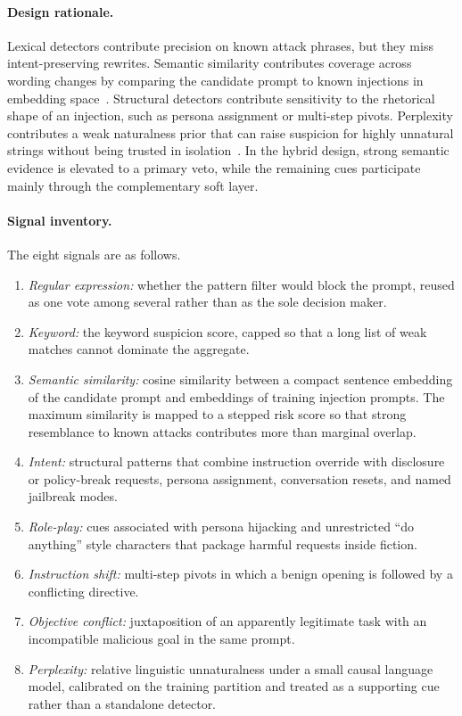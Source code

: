 ﻿\documentclass[10pt]{article}
\begin{document}
\paragraph{Design rationale.}
Lexical detectors contribute precision on known attack phrases, but they miss intent-preserving rewrites.
Semantic similarity contributes coverage across wording changes by comparing the candidate prompt to known injections in embedding space~\cite{reimers2019sentence,wang2020minilm}.
Structural detectors contribute sensitivity to the rhetorical shape of an injection, such as persona assignment or multi-step pivots.
Perplexity contributes a weak naturalness prior that can raise suspicion for highly unnatural strings without being trusted in isolation~\cite{radford2019language}.
In the hybrid design, strong semantic evidence is elevated to a primary veto, while the remaining cues participate mainly through the complementary soft layer.

\paragraph{Signal inventory.}
The eight signals are as follows.
\begin{enumerate}
  \item \emph{Regular expression:} whether the pattern filter would block the prompt, reused as one vote among several rather than as the sole decision maker.
  \item \emph{Keyword:} the keyword suspicion score, capped so that a long list of weak matches cannot dominate the aggregate.
  \item \emph{Semantic similarity:} cosine similarity between a compact sentence embedding of the candidate prompt and embeddings of training injection prompts.
    The maximum similarity is mapped to a stepped risk score so that strong resemblance to known attacks contributes more than marginal overlap.
  \item \emph{Intent:} structural patterns that combine instruction override with disclosure or policy-break requests, persona assignment, conversation resets, and named jailbreak modes.
  \item \emph{Role-play:} cues associated with persona hijacking and unrestricted ``do anything'' style characters that package harmful requests inside fiction.
  \item \emph{Instruction shift:} multi-step pivots in which a benign opening is followed by a conflicting directive.
  \item \emph{Objective conflict:} juxtaposition of an apparently legitimate task with an incompatible malicious goal in the same prompt.
  \item \emph{Perplexity:} relative linguistic unnaturalness under a small causal language model, calibrated on the training partition and treated as a supporting cue rather than a standalone detector.
\end{enumerate}
\end{document}
